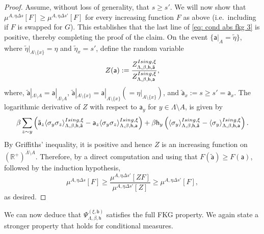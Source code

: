 \documentclass[11pt,a4paper]{article}
\theoremstyle{definition}
\numberwithin{equation}{section}
\begin{document}
\begin{proof}
Assume, without loss of generality, that $s\geq s'$. We will now show that $\mu^{A,\eta\Delta s}[F] \geq \mu^{A,\eta\Delta s'}[F]$ for every increasing function $F$ as above (i.e.\ including if $F$ is swapped for $G$). This establishes that the last line of \eqref{eq: cond abs fkg 3} is positive, thereby completing the proof of the claim. On the event $\{ \mathsf a|_A = \tilde\eta\}$, where $\tilde \eta|_{A \setminus \{x\}}=\eta$ and $\tilde \eta_x= s'$, define the random variable 
\begin{equation}
Z(\mathsf a):= \frac{Z^{\rm Ising,\xi}_{\Lambda,\beta, \mathsf{h},\tilde {\mathsf{a}}}}{Z^{\rm Ising,\xi}_{\Lambda,\beta, \mathsf{h},\mathsf{a}}}, 
\end{equation}
where, $\tilde{\mathsf{a}}|_{\Lambda\setminus A}=\mathsf{a}|_{\Lambda\setminus A}$, $\tilde{\mathsf{a}}|_{A \setminus \{x\}}=\mathsf{a}|_{A\setminus\{x\}} (=\eta|_{A\setminus\{x\}})$, and $\tilde{\mathsf{a}}_x := s \geq s'=\mathsf{a}_x$. The logarithmic derivative of $Z$ with respect to $\mathsf a_y$ for $y \in \Lambda \setminus A$, is given by
\begin{equation}\label{eq:log derivative1}
\beta \sum_{z\sim y}\left(  \tilde {\mathsf a}_z \langle \sigma_y \sigma_z \rangle^{\rm Ising,\xi}_{\Lambda, \beta,\mathsf{h},\tilde {\mathsf{a}}}-\mathsf a_z \langle \sigma_y \sigma_z \rangle^{\rm Ising,\xi}_{\Lambda, \beta, \mathsf h,\mathsf{a}} \right)+ \beta \mathsf h_y \left( \langle \sigma_y \rangle^{\rm Ising,\xi}_{\Lambda, \beta, \mathsf{h},\tilde {\mathsf{a}}}- \langle \sigma_y \rangle^{\rm Ising,\xi}_{\Lambda, \beta, \mathsf h,\mathsf{a}} \right).
\end{equation}
By Griffiths' inequality, it is positive and hence $Z$ is an increasing function on $(\mathbb R^+)^{\overline{\Lambda} \setminus A}$. Therefore, by a direct computation and using that $F(\tilde{\mathsf{a}}) \geq F(\mathsf{a})$, followed by the induction hypothesis,
\begin{equation}
\mu^{A,\eta\Delta s}[F] \geq \frac{\mu^{A,\eta\Delta s'}[ZF]}{\mu^{A,\eta\Delta s'}[Z]} \geq \mu^{A,\eta \Delta s'}[F],
\end{equation}
as desired.
\end{proof}


We can now deduce that $\Psi_{\Lambda,\beta,\mathsf{h}}^{(\xi,\mathsf{b})}$ satisfies the full FKG property. We again state a stronger property that holds for conditional measures. 
\end{document}
